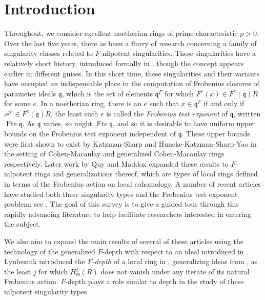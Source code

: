 \documentclass{amsproc}
\theoremstyle{definition}
\theoremstyle{remark}
\numberwithin{equation}{section}
\newcommand{\fm}{\mathfrak{m}}
\newcommand{\fq}{\mathfrak{q}}
\newcommand{\fte}{\operatorname{Fte}}
\begin{document}
\section{Introduction}

Throughout, we consider excellent noetherian rings of prime characteristic $p>0$. Over the last five years, there as been a flurry of research concerning a family of singularity classes related to $F$-nilpotent singularities. These singularities have a relatively short history, introduced formally in \cite{ST17}, though the concept appears earlier \cite{BB05,Lyu97} in different guises. In this short time, these singularities and their variants have occupied an indispensable place in the computation of Frobenius closures of parameter ideals $\fq$, which is the set of elements $\fq^F$ for which $F^e(x) \in F^e(\fq)R$ for some $e$. In a noetherian ring, there is an $e$ such that $x \in \fq^F$ if and only if $x^{p^e} \in F^e(\fq)R$, the least such $e$ is called the \textit{Frobenius test exponent} of $\fq$, written $\fte \fq$. As $\fq$ varies, so might $\fte \fq$, and so it is desirable to have uniform upper bounds on the Frobenius test exponent independent of $\fq$. These upper bounds were first shown to exist by Katzman-Sharp \cite{KS06} and Huneke-Katzman-Sharp-Yao \cite{HKSY06} in the setting of Cohen-Macaulay and generalized Cohen-Macaulay rings respectively. Later work by Quy \cite{Quy19} and Maddox \cite{Mad19} expanded these results to $F$-nilpotent rings and generalizations thereof, which are types of local rings defined in terms of the Frobenius action on local cohomology. A number of recent articles have studied both these singularity types and the Frobenius test exponent problem; see \cite{CMM23,DMP24,HQ19,HQ20,HQ23,KMPS23,MM24,MP23,MS25,PQ19}. The goal of this survey is to give a guided tour through this rapidly advancing literature to help facilitate researchers interested in entering the subject. 

We also aim to expand the main results of several of these articles using the technology of the generalized $F$-depth with respect to an ideal introduced in \cite{CMM23}. Lyubeznik introduced the \textit{$F$-depth} of a local ring in \cite{Lyu06}, generalizing ideas from \cite{HS77}, as the least $j$ for which $H^j_\fm(R)$ does not vanish under any iterate of its natural Frobenius action. $F$-depth plays a role similar to depth in the study of these nilpotent singularity types. 
\end{document}

